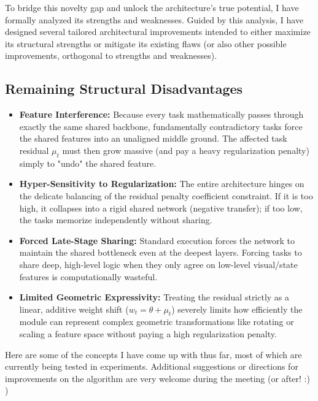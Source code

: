 \documentclass[11pt,a4paper]{article}
\begin{document}
To bridge this novelty gap and unlock the architecture's true potential, I have formally analyzed its strengths and weaknesses. Guided by this analysis, I have designed several tailored architectural improvements intended to either maximize its structural strengths or mitigate its existing flaws (or also other possible improvements, orthogonal to strengths and weaknesses).

\subsection*{Remaining Structural Disadvantages}
\begin{itemize}
    \item \textbf{Feature Interference:} Because every task mathematically passes through exactly the same shared backbone, fundamentally contradictory tasks force the shared features into an unaligned middle ground. The affected task residual $\mu_t$ must then grow massive (and pay a heavy regularization penalty) simply to "undo" the shared feature.
    \item \textbf{Hyper-Sensitivity to Regularization:} The entire architecture hinges on the delicate balancing of the residual penalty coefficient constraint. If it is too high, it collapses into a rigid shared network (negative transfer); if too low, the tasks memorize independently without sharing.
    \item \textbf{Forced Late-Stage Sharing:} Standard execution forces the network to maintain the shared bottleneck even at the deepest layers. Forcing tasks to share deep, high-level logic when they only agree on low-level visual/state features is computationally wasteful.
    \item \textbf{Limited Geometric Expressivity:} Treating the residual strictly as a linear, additive weight shift ($w_t = \theta + \mu_t$) severely limits how efficiently the module can represent complex geometric transformations like rotating or scaling a feature space without paying a high regularization penalty.
\end{itemize}

Here are some of the concepts I have come up with thus far, most of which are currently being tested in experiments. Additional suggestions or directions for improvements on the algorithm are very welcome during the meeting (or after! :) )
\end{document}
